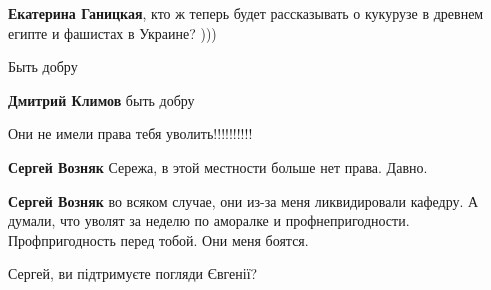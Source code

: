 \begin{itemize}
\begin{itemize}
\textbf{Екатерина Ганицкая}, кто ж теперь будет рассказывать о кукурузе в древнем египте и фашистах в Украине? )))
\end{itemize}

 
Быть добру

\begin{itemize}
 
\textbf{Дмитрий Климов} быть добру
\end{itemize}

 
Они не имели права тебя уволить!!!!!!!!!!

\begin{itemize}
 
\textbf{Сергей Возняк} Сережа, в этой местности больше нет права. Давно.

 
\textbf{Сергей Возняк} во всяком случае, они из-за меня ликвидировали кафедру. А думали, что уволят за неделю по аморалке и профнепригодности. Профпригодность перед тобой. Они меня боятся.

 
Сергей, ви підтримуєте погляди Євгенії?


\end{itemize}
\end{itemize}

